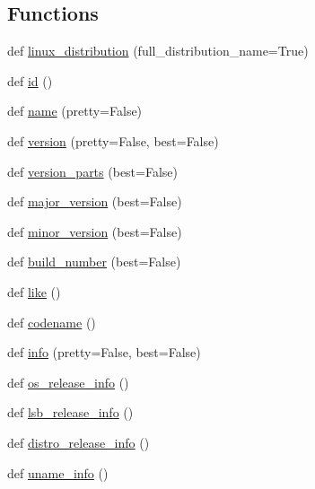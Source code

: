 \subsection*{Functions}
\begin{DoxyCompactItemize}
\item 
def \hyperlink{namespacepip_1_1__vendor_1_1distro_a865830705e3dca30a022cfa469606cca}{linux\+\_\+distribution} (full\+\_\+distribution\+\_\+name=True)
\item 
def \hyperlink{namespacepip_1_1__vendor_1_1distro_a9a240f009c8550ce7857b788d952c653}{id} ()
\item 
def \hyperlink{namespacepip_1_1__vendor_1_1distro_ac8123e12e7ecaf7e1c950d7dadde82b3}{name} (pretty=False)
\item 
def \hyperlink{namespacepip_1_1__vendor_1_1distro_a0f7a78ea940419ee27cd0b0a5694be3e}{version} (pretty=False, best=False)
\item 
def \hyperlink{namespacepip_1_1__vendor_1_1distro_a6980a60d8a6df99832c5417cc59716b2}{version\+\_\+parts} (best=False)
\item 
def \hyperlink{namespacepip_1_1__vendor_1_1distro_a7ba57b1c4ee35dc171765941dd3ec476}{major\+\_\+version} (best=False)
\item 
def \hyperlink{namespacepip_1_1__vendor_1_1distro_a27fb0b8ec4acf78ab726aea7fa592bb9}{minor\+\_\+version} (best=False)
\item 
def \hyperlink{namespacepip_1_1__vendor_1_1distro_a1b16f81da06ea68f2fe34663893ffacd}{build\+\_\+number} (best=False)
\item 
def \hyperlink{namespacepip_1_1__vendor_1_1distro_afe2ac4116a69f742b9db939150a331a8}{like} ()
\item 
def \hyperlink{namespacepip_1_1__vendor_1_1distro_ae28a5690d8f0b03567eb4a8e04c597e1}{codename} ()
\item 
def \hyperlink{namespacepip_1_1__vendor_1_1distro_a80146cc8c9c2f6d751f2754996ae5157}{info} (pretty=False, best=False)
\item 
def \hyperlink{namespacepip_1_1__vendor_1_1distro_a4ccfe219ce2e3c7ba2c406db30180d06}{os\+\_\+release\+\_\+info} ()
\item 
def \hyperlink{namespacepip_1_1__vendor_1_1distro_a9fd2e7c31fd954f50caf8bb1cf7e8ee5}{lsb\+\_\+release\+\_\+info} ()
\item 
def \hyperlink{namespacepip_1_1__vendor_1_1distro_aaf9998b3f35ded1bcc91d2e50884035c}{distro\+\_\+release\+\_\+info} ()
\item 
def \hyperlink{namespacepip_1_1__vendor_1_1distro_af7bba6d8298bb220d1615d8cdf5ebb09}{uname\+\_\+info} ()

\end{DoxyCompactItemize}
